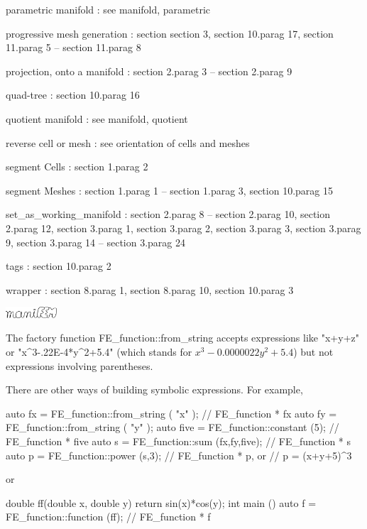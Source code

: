 parametric manifold : see manifold, parametric

progressive mesh generation : section \numb section 3, \numb section 10.\numb parag 17,
\numb section 11.\numb parag 5 -- \numb section 11.\numb parag 8

projection, onto a manifold : \numb section 2.\numb parag 3 -- \numb section 2.\numb parag 9

quad-tree : \numb section 10.\numb parag 16

quotient manifold : see manifold, quotient

reverse cell or mesh : see orientation of cells and meshes

segment {\codett Cell}s : \numb section 1.\numb parag 2

segment {\codett Mesh}es : \numb section 1.\numb parag 1 -- \numb section 1.\numb parag 3,
\numb section 10.\numb parag 15

{\codett set\_as\_working\_manifold} : \numb section 2.\numb parag 8 --
\numb section 2.\numb parag 10, \numb section 2.\numb parag 12, \numb section 3.\numb parag 1,
\numb section 3.\numb parag 2, \numb section 3.\numb parag 3, \numb section 3.\numb parag 9,
\numb section 3.\numb parag 14 -- \numb section 3.\numb parag 24

{\codett tag}s : \numb section 10.\numb parag 2

wrapper : \numb section 8.\numb parag 1, \numb section 8.\numb parag 10, \numb section 10.\numb parag 3


\bye




\hbox{\includegraphics[width=19mm]{manifem-small.eps}}


The factory function {\codett FE\_function::from\_string} accepts expressions like {\codett "x+y+z"} or
{\codett "x\^{}3-.22E-4*y\^{}2+5.4"} (which stands for $ x^3 - 0.0000022y^2+5.4$) 
but not expressions involving parentheses.

There are other ways of building symbolic expressions.
For example,

\verbatim
   auto fx = FE_function::from_string ( "x" ); // FE_function * fx
   auto fy = FE_function::from_string ( "y" );
   auto five = FE_function::constant (5); // FE_function * five
   auto s = FE_function::sum (fx,fy,five); // FE_function * s
   auto p = FE_function::power (s,3); // FE_function * p, or
   // p = (x+y+5)^3
\endverbatim

\noindent or

\verbatim
double ff(double x, double y) { return sin(x)*cos(y); }
int main () {
   auto f = FE_function::function (ff); // FE_function * f
}\endverbatim
















